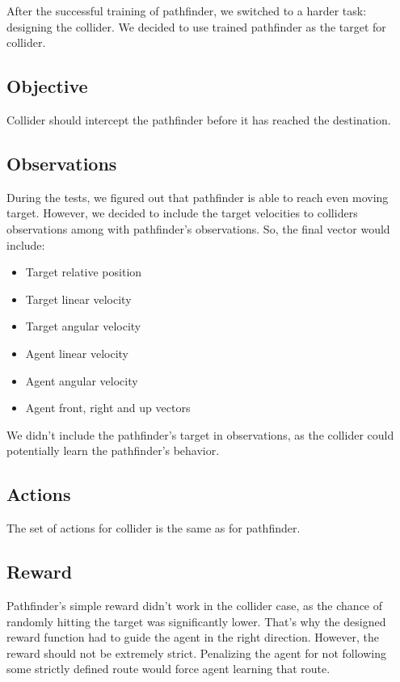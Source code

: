 
After the successful training of pathfinder, we switched to a harder task: designing the collider.
We decided to use trained pathfinder as the target for collider.

\subsection{Objective}\label{subsec:collider_objective}
Collider should intercept the pathfinder before it has reached the destination.

\subsection{Observations}\label{subsec:collider_observations}
During the tests, we figured out that pathfinder is able to reach even moving target.
However, we decided to include the target velocities to colliders observations among with pathfinder's observations.
So, the final vector would include:
\begin{itemize}
	\item Target relative position
	\item Target linear velocity
	\item Target angular velocity
	\item Agent linear velocity
	\item Agent angular velocity
	\item Agent front, right and up vectors
\end{itemize}
We didn't include the pathfinder's target in observations,
as the collider could potentially learn the pathfinder's behavior.

\subsection{Actions}\label{subsec:collider_actions}
The set of actions for collider is the same as for pathfinder.

\subsection{Reward}\label{subsec:reward}
Pathfinder's simple reward didn't work in the collider case,
as the chance of randomly hitting the target was significantly lower.
That's why the designed reward function had to guide the agent in the right direction.
However, the reward should not be extremely strict.
Penalizing the agent for not following some strictly defined route would force agent learning that route.

